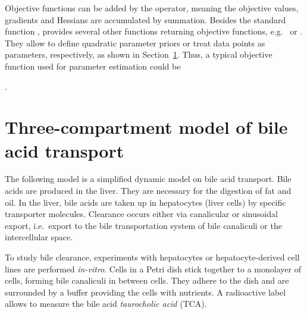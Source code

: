 \documentclass[article]{jss}
\begin{document}
Objective functions can be added by the  operator, meaning the objective values, gradients and Hessians are accumulated by summation. Besides the standard function ,  provides several other functions returning objective functions, e.g.~ or . They allow to define quadratic parameter priors or treat data points as parameters, respectively, as shown in Section~\ref{sec:example}. Thus, a typical objective function used for parameter estimation could be
\begin{center}
	.
\end{center}


\section{Three-compartment model of bile acid transport}
\label{sec:example}

The following model is a simplified dynamic model on bile acid transport. Bile acids are produced in the liver. They are necessary for the digestion of fat and oil. In the liver, bile acids are taken up in hepatocytes (liver cells) by specific transporter molecules. Clearance occurs either via canalicular or sinusoidal export, i.e.~export to the bile transportation system of bile canaliculi or the intercellular space.

To study bile clearance, experiments with hepatocytes or hepatocyte-derived cell lines are performed \textit{in-vitro}. Cells in a Petri dish stick together to a monolayer of cells, forming bile canaliculi in between cells. They adhere to the dish and are surrounded by a buffer providing the cells with nutrients. A radioactive label allows to measure the bile acid \textit{taurocholic acid} (TCA).
\end{document}
